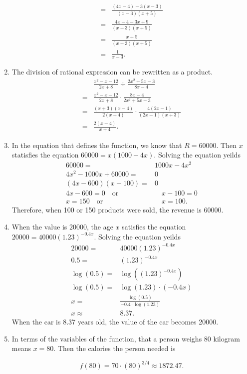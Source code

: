 \documentclass[
  12pt]{article}
\begin{document}
\begin{enumerate}
\[\begin{aligned}
  =&\frac{(4x-4)-3(x-3)}{(x-3)(x+5)}\\
  =&\frac{4x-4-3x+9}{(x-3)(x+5)}\\
  =&\frac{x+5}{(x-3)(x+5)}\\
  =&\frac{1}{x-3}.
  \end{aligned}
  \]
\item
  The division of rational expression can be rewritten as a product. \[
  \begin{aligned}
  &\frac{x^2-x-12}{2x+8}\div\frac{2x^2+5x-3}{8x-4}\\
  =&\frac{x^2-x-12}{2x+8}\cdot\frac{8x-4}{2x^2+5x-3}\\
  =&\frac{(x+3)(x-4)}{2(x+4)}\cdot\frac{4(2x-1)}{(2x-1)(x+3)}\\
  =&\frac{2(x-4)}{x+4}.
  \end{aligned}
  \]
\item
  In the equation that defines the function, we know that \(R=60000\).
  Then \(x\) statisfies the equation \(60000=x(1000-4x)\). Solving the
  equation yeilds \[
  \begin{aligned}
  60000=&1000x-4x^2\\
  4x^2-1000x+60000=&0\\
  (4x-600)(x-100)=&0\\
  4x-600=0\quad\text{or}&\quad x-100=0\\
  x=150\quad\text{or}&\quad x=100.
  \end{aligned}
  \] Therefore, when 100 or 150 products were sold, the revenue is
  60000.
\item
  When the value is \(20000\), the age \(x\) satisfies the equation
  \(20000=40000(1.23)^{-0.4x}\). Solving the equation yeilds \[
  \begin{aligned}
  20000=&40000(1.23)^{-0.4x}\\
  0.5=&(1.23)^{-0.4x}\\
  \log(0.5)=&\log((1.23)^{-0.4x})\\
  \log(0.5)=&\log(1.23)\cdot(-0.4x)\\
  x=&\frac{\log(0.5)}{-0.4\cdot\log(1.23)}\\
  x\approx&8.37.
  \end{aligned}
  \] When the car is 8.37 years old, the value of the car becomes 20000.
\item
  In terms of the variables of the function, that a person weighs 80
  kilogram means \(x=80\). Then the calories the person needed is

  \[f(80)=70\cdot(80)^{3/4}\approx 1872.47.\]


\end{enumerate}
\end{document}
